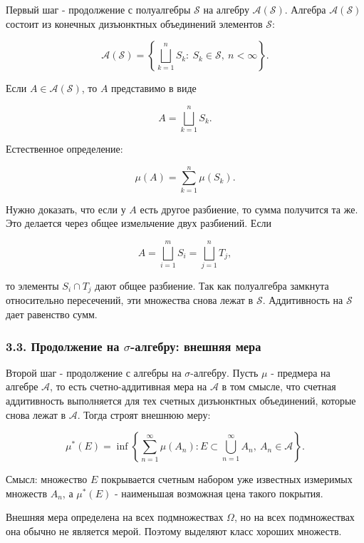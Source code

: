 \documentclass[
  11pt,
  a4paper,
]{article}
\begin{document}
Первый шаг - продолжение с полуалгебры \(\mathcal S\) на алгебру
\(\mathcal A(\mathcal S)\). Алгебра \(\mathcal A(\mathcal S)\) состоит
из конечных дизъюнктных объединений элементов \(\mathcal S\):

\[
\mathcal A(\mathcal S)=
\left\{
\bigsqcup_{k=1}^n S_k:\ S_k\in\mathcal S,\ n<\infty
\right\}.
\]

Если \(A\in\mathcal A(\mathcal S)\), то \(A\) представимо в виде

\[
A=\bigsqcup_{k=1}^n S_k.
\]

Естественное определение:

\[
\mu(A)=\sum_{k=1}^n\mu(S_k).
\]

Нужно доказать, что если у \(A\) есть другое разбиение, то сумма
получится та же. Это делается через общее измельчение двух разбиений.
Если

\[
A=\bigsqcup_{i=1}^m S_i=\bigsqcup_{j=1}^n T_j,
\]

то элементы \(S_i\cap T_j\) дают общее разбиение. Так как полуалгебра
замкнута относительно пересечений, эти множества снова лежат в
\(\mathcal S\). Аддитивность на \(\mathcal S\) дает равенство сумм.

\subsubsection{\texorpdfstring{3.3. Продолжение на \(\sigma\)-алгебру:
внешняя
мера}{3.3. Продолжение на \textbackslash sigma-алгебру: внешняя мера}}\label{ux43fux440ux43eux434ux43eux43bux436ux435ux43dux438ux435-ux43dux430-sigma-ux430ux43bux433ux435ux431ux440ux443-ux432ux43dux435ux448ux43dux44fux44f-ux43cux435ux440ux430}

Второй шаг - продолжение с алгебры на \(\sigma\)-алгебру. Пусть \(\mu\)
- предмера на алгебре \(\mathcal A\), то есть счетно-аддитивная мера на
\(\mathcal A\) в том смысле, что счетная аддитивность выполняется для
тех счетных дизъюнктных объединений, которые снова лежат в
\(\mathcal A\). Тогда строят внешнюю меру:

\[
\mu^*(E)=
\inf\left\{
\sum_{n=1}^{\infty}\mu(A_n):
E\subset\bigcup_{n=1}^{\infty}A_n,\ A_n\in\mathcal A
\right\}.
\]

Смысл: множество \(E\) покрывается счетным набором уже известных
измеримых множеств \(A_n\), а \(\mu^*(E)\) - наименьшая возможная цена
такого покрытия.

Внешняя мера определена на всех подмножествах \(\Omega\), но на всех
подмножествах она обычно не является мерой. Поэтому выделяют класс
хороших множеств.
\end{document}
